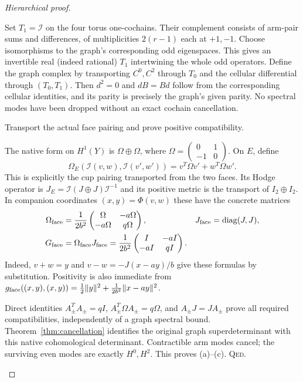 \documentclass[11pt,a4paper]{article}
\theoremstyle{remark}\newtheorem{remark}[definition]{Remark}
\newcommand{\diag}{\operatorname{diag}}\newcommand{\id}{\operatorname{id}}
\newcommand{\QED}{\textsc{Qed}}
\begin{document}
\begin{proof}[Hierarchical proof]
\begin{steps}
\begin{steps}
\item Set $T_1=\mathcal I$ on the four torus one-cochains. Their complement consists of arm-pair sums and differences, of multiplicities $2(r-1)$ each at $+1,-1$. Choose isomorphisms to the graph's corresponding odd eigenspaces. This gives an invertible real (indeed rational) $T_1$ intertwining the whole odd operators. Define the graph complex by transporting $C^0,C^2$ through $T_0$ and the cellular differential through $(T_0,T_1)$. Then $d^2=0$ and $dB=Bd$ follow from the corresponding cellular identities, and its parity is precisely the graph's given parity. No spectral modes have been dropped without an exact cochain cancellation.
\end{steps}
\item Transport the actual face pairing and prove positive compatibility.
\begin{steps}
\item The native form on $H^1(Y)$ is $\Omega\oplus\Omega$, where $\Omega=\left(\begin{smallmatrix}0&1\\-1&0\end{smallmatrix}\right)$. On $E$, define
\[
\Omega_E(\mathcal I(v,w),\mathcal I(v',w'))
=v^T\Omega v'+w^T\Omega w'.
\]
This is explicitly the cup pairing transported from the two faces. Its Hodge operator is $J_E=\mathcal I(J\oplus J)\mathcal I^{-1}$ and its positive metric is the transport of $I_2\oplus I_2$. In companion coordinates $(x,y)=\Phi(v,w)$ these have the concrete matrices
\begin{align*}
\Omega_{\rm face}&=\frac1{2b^2}\begin{pmatrix}\Omega&-a\Omega\\-a\Omega&q\Omega\end{pmatrix},
&J_{\rm face}&=\diag(J,J),\\
G_{\rm face}&=\Omega_{\rm face}J_{\rm face}
=\frac1{2b^2}\begin{pmatrix}I&-aI\\-aI&qI\end{pmatrix}.
\end{align*}
Indeed, $v+w=y$ and $v-w=-J(x-ay)/b$ give these formulas by substitution. Positivity is also immediate from
$g_{\rm face}((x,y),(x,y))=\tfrac12\|y\|^2+\tfrac1{2b^2}\|x-ay\|^2$.
\item Direct identities $A_\pm^TA_\pm=qI$, $A_\pm^T\Omega A_\pm=q\Omega$, and $A_\pm J=JA_\pm$ prove all required compatibilities, independently of a graph spectral bound. Theorem~\ref{thm:cancellation} identifies the original graph superdeterminant with this native cohomological determinant. Contractible arm modes cancel; the surviving even modes are exactly $H^0,H^2$. This proves (a)--(c). \QED.
\end{steps}
\end{steps}
\end{proof}
\end{document}
